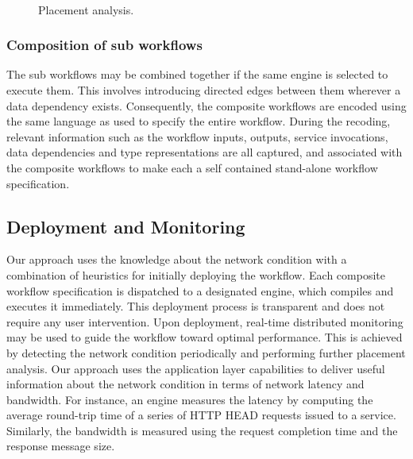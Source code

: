 \documentclass[10pt, conference, compsocconf]{IEEEtran}
\begin{document}
\begin{figure}[h]
\centering
\\
\caption{Placement analysis.}
\label{workflowplacementfigure}
\end{figure}


\subsubsection{Composition of sub workflows}\label{compositionsection}
The sub workflows may be combined together if the same engine is selected to execute them.
This involves introducing directed edges between them wherever a data dependency exists.
Consequently, the composite workflows are encoded using the same language as used to specify the entire workflow.
During the recoding, relevant information such as the workflow inputs, outputs, service invocations, data dependencies and type representations are all captured, and associated with the composite workflows to make each a self contained stand-alone workflow specification.

\subsection{Deployment and Monitoring}

Our approach uses the knowledge about the network condition with a combination of heuristics for initially deploying the workflow.
Each composite workflow specification is dispatched to a designated engine, which compiles and executes it immediately.
This deployment process is transparent and does not require any user intervention.
Upon deployment, real-time distributed monitoring may be used to guide the workflow toward optimal performance.
This is achieved by detecting the network condition periodically and performing further placement analysis.
Our approach uses the application layer capabilities to deliver useful information about the network condition in terms of network latency and bandwidth.
For instance, an engine measures the latency by computing the average round-trip time of a series of HTTP HEAD requests issued to a service.
Similarly, the bandwidth is measured using the request completion time and the response message size.
\end{document}
